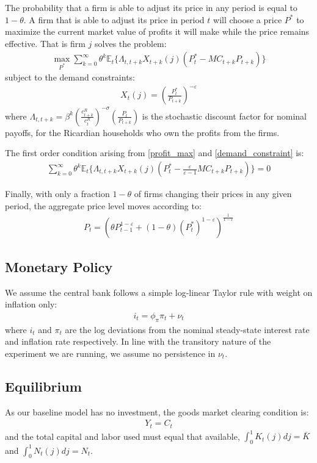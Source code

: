 \documentclass[12pt,a4paper]{article}
\begin{document}
The probability that a firm is able to adjust its price in any period is equal to $1-\theta$. A firm that is able to adjust its price in period $t$ will choose a price $P^*$ to maximize the current market value of profits it will make while the price remains effective. That is firm $j$ solves the problem:
\begin{align}
\underset{P^*}{\max} \sum_{k=0}^{\infty} \theta^k \mathbb{E}_t \{{\Lambda}_{t,t+k} X_{t+k}(j) (P_t^* - MC_{t+k}P_{t+k}) \} \label{profit_max}
\end{align}
subject to the demand constraints:
\begin{align}
X_t(j) = \left(\frac{P_t^*}{P_{t+k}}\right)^{-\varepsilon} \label{demand_constraint}
\end{align}
where ${\Lambda}_{t,t+k} = \beta^k \left(\frac{c^R_{t+k}}{c^R_{t}}\right)^{-\sigma} \left( \frac{P_t}{P_{t+k}} \right)$ is the stochastic discount factor for nominal payoffs, for the Ricardian households who own the profits from the firms. 

The first order condition arising from \ref{profit_max}  and \ref{demand_constraint} is:
\begin{align}
\sum_{k=0}^{\infty} \theta^k \mathbb{E}_t \Big\{{\Lambda}_{t,t+k} X_{t+k}(j) \left(P_t^* - \frac{\varepsilon}{\varepsilon-1}MC_{t+k} P_{t+k}\right)  \Big\} = 0 \label{foc_pricing}
\end{align}

Finally, with only a fraction $1-\theta$ of firms changing their prices in any given period, the aggregate price level moves according to:
\begin{align*}
P_t = \left(   \theta P_{t-1}^{1-\varepsilon} + (1-\theta)(P_t^*)^{1-\varepsilon}\right)^{\frac{1}{1-\varepsilon}}
\end{align*}

\subsection{Monetary Policy}
We assume the central bank follows a simple log-linear Taylor rule with weight on inflation only:
\begin{align}
i_t = \phi_{\pi} \pi_t + \nu_t	\label{taylor_rule}
\end{align}
where $i_t$ and $\pi_t$ are the log deviations from the nominal steady-state interest rate and inflation rate respectively. In line with the transitory nature of the experiment we are running, we assume no persistence in $\nu_t$.

\subsection{Equilibrium}
As our baseline model has no investment, the goods market clearing condition is:
\begin{align}
Y_t = C_t	\label{agg_prod}
\end{align}
and the total capital and labor used must equal that available, $\int_0^1 K_t(j)dj = \bar{K}$ and $\int_0^1 N_t(j)dj = N_t$.
\end{document}
